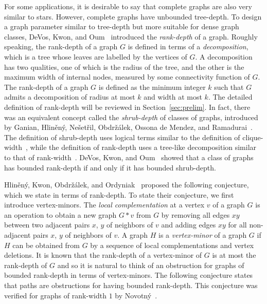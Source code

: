 \documentclass[11pt]{article}
\begin{document}
For some applications, it is desirable to say that complete graphs are also very similar to stars. However, complete graphs have unbounded tree-depth.
To design a graph parameter similar to tree-depth but more suitable for dense graph classes, DeVos, Kwon, and Oum~\cite{DKO2019} introduced the \emph{rank-depth} of a graph.
Roughly speaking, the rank-depth of a graph $G$ is defined in terms of 
a \emph{decomposition},
which is a tree whose leaves are labelled by the vertices of $G$.
A decomposition has two qualities, one of which is the radius of the tree,
and the other is the maximum width of internal nodes, measured
by some connectivity function of $G$.
The rank-depth of a graph $G$ is defined as the minimum integer $k$
such that $G$ admits a decomposition of radius at most $k$ and width at most $k$.
The detailed definition of rank-depth will be reviewed in Section~\ref{sec:prelim}.
In fact, there was an equivalent concept called the \emph{shrub-depth} of classes of graphs, introduced by Ganian, Hlin\v{e}n\'y, Ne{\v{s}}et{\v{r}}il, Obdr\v{z}\'alek, Ossona de Mendez, and Ramadurai~\cite{GHNOO2017,GHNOOR2012}.
The definition of shrub-depth uses logical terms similar to the definition of clique-width~\cite{CO2000}, while the definition of rank-depth uses a tree-like decomposition similar to that of rank-width~\cite{OS2004}.
DeVos, Kwon, and Oum~\cite{DKO2019} showed that a class of graphs has bounded rank-depth if and only if it has bounded shrub-depth.

Hlin{\v{e}}n{\'y}, Kwon, Obdr{\v{z}}{\'a}lek, and Ordyniak~\cite{HlinenyKJS2016}
proposed the following conjecture, which we state in terms of rank-depth.
To state their conjecture, we first introduce vertex-minors. 
The \emph{local complementation} at a vertex $v$ of a graph $G$ is an operation
to obtain a new graph $G*v$ from $G$ by removing all edges $xy$ between two adjacent pairs $x$, $y$ of neighbors of $v$ and adding edges $xy$ for all non-adjacent pairs $x$, $y$ of neighbors of $v$. 
A graph $H$ is a \emph{vertex-minor} of a graph $G$ if $H$ can be obtained from $G$ by a sequence of local complementations and vertex deletions. 
It is known that the rank-depth of a vertex-minor of $G$ is at most the rank-depth of $G$ and so it is natural to think of an obstruction for graphs of bounded rank-depth in terms of vertex-minors. The following conjecture states that paths are obstructions for having bounded rank-depth. 
This conjecture was verified for graphs of rank-width $1$ by Novotn{\'y}~\cite[Theorem 6.3.2]{Novotny2016}.
\end{document}
